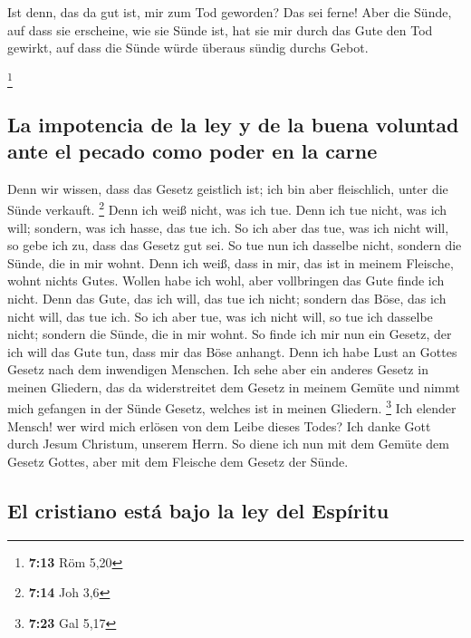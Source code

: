  Ist denn, das da gut ist, mir zum Tod geworden? Das sei
ferne! Aber die Sünde, auf dass sie erscheine, wie sie Sünde ist, hat
sie mir durch das Gute den Tod gewirkt, auf dass die Sünde würde überaus
sündig durchs Gebot.

\footnote{\textbf{7:13} Röm 5,20}

\hypertarget{la-impotencia-de-la-ley-y-de-la-buena-voluntad-ante-el-pecado-como-poder-en-la-carne}{%
\subsection{La impotencia de la ley y de la buena voluntad ante el
pecado como poder en la
carne}\label{la-impotencia-de-la-ley-y-de-la-buena-voluntad-ante-el-pecado-como-poder-en-la-carne}}

 Denn wir wissen, dass das Gesetz geistlich ist; ich bin
aber fleischlich, unter die Sünde verkauft. \footnote{\textbf{7:14} Joh
  3,6}  Denn ich weiß nicht, was ich tue. Denn ich tue
nicht, was ich will; sondern, was ich hasse, das tue ich.
 So ich aber das tue, was ich nicht will, so gebe ich zu,
dass das Gesetz gut sei.  So tue nun ich dasselbe nicht,
sondern die Sünde, die in mir wohnt.  Denn ich weiß, dass
in mir, das ist in meinem Fleische, wohnt nichts Gutes. Wollen habe ich
wohl, aber vollbringen das Gute finde ich nicht.  Denn
das Gute, das ich will, das tue ich nicht; sondern das Böse, das ich
nicht will, das tue ich.  So ich aber tue, was ich nicht
will, so tue ich dasselbe nicht; sondern die Sünde, die in mir wohnt.
 So finde ich mir nun ein Gesetz, der ich will das Gute
tun, dass mir das Böse anhangt.  Denn ich habe Lust an
Gottes Gesetz nach dem inwendigen Menschen.  Ich sehe
aber ein anderes Gesetz in meinen Gliedern, das da widerstreitet dem
Gesetz in meinem Gemüte und nimmt mich gefangen in der Sünde Gesetz,
welches ist in meinen Gliedern. \footnote{\textbf{7:23} Gal 5,17}
 Ich elender Mensch! wer wird mich erlösen von dem Leibe
dieses Todes?  Ich danke Gott durch Jesum Christum,
unserem Herrn. So diene ich nun mit dem Gemüte dem Gesetz Gottes, aber
mit dem Fleische dem Gesetz der Sünde.

\hypertarget{el-cristiano-estuxe1-bajo-la-ley-del-espuxedritu}{%
\subsection{El cristiano está bajo la ley del
Espíritu}\label{el-cristiano-estuxe1-bajo-la-ley-del-espuxedritu}}


